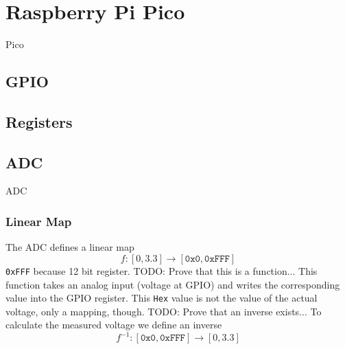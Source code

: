 \section{Raspberry Pi Pico}

Pico

\subsection{GPIO}


\subsection{Registers}


\subsection{ADC}

ADC

\subsubsection{Linear Map}
The ADC defines a linear map 
$$f: [0,3.3] \rightarrow [\texttt{0x0}, \texttt{0xFFF}]$$ \newline
\texttt{0xFFF} because 12 bit register. \newline
TODO: Prove that this is a function... \newline
This function takes an analog input (voltage at GPIO) and writes the corresponding value into the GPIO register. \newline
This \texttt{Hex} value is not the value of the actual voltage, only a mapping, though.
TODO: Prove that an inverse exists... \newline
To calculate the measured voltage we define an inverse
$$
	f^{-1}: [\texttt{0x0}, \texttt{0xFFF}] \rightarrow [0, 3.3]
$$
